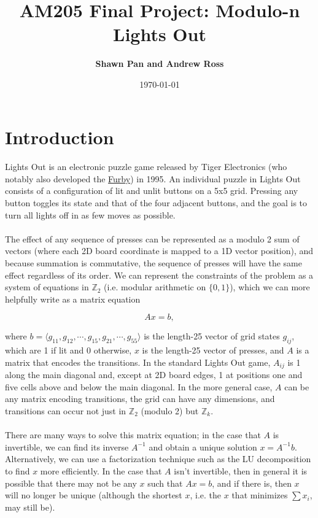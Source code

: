 \documentclass[11pt]{article}
\title{
\vspace{1cm}
\textmd{\textbf{AM205 Final Project: Modulo-n Lights Out}}\\
}
\author{\textbf{Shawn Pan and Andrew Ross}}
\date{\today}
\begin{document}
\maketitle

\section*{Introduction}

\paragraph{} Lights Out is an electronic puzzle game released by Tiger Electronics (who notably also developed the \href{https://en.wikipedia.org/wiki/Furby}{Furby}) in 1995. An individual puzzle in Lights Out consists of a configuration of lit and unlit buttons on a 5x5 grid. Pressing any button toggles its state and that of the four adjacent buttons, and the goal is to turn all lights off in as few moves as possible.

\paragraph{} The effect of any sequence of presses can be represented as a modulo 2 sum of vectors (where each 2D board coordinate is mapped to a 1D vector position), and because summation is commutative, the sequence of presses will have the same effect regardless of its order. We can represent the constraints of the problem as a system of equations in $\mathbb{Z}_2$ (i.e. modular arithmetic on $\{0, 1\}$), which we can more helpfully write as a matrix equation

\begin{equation}
Ax = b,
\end{equation}

\noindent where $b = \langle g_{11}, g_{12}, \cdots, g_{15}, g_{21}, \cdots, g_{55} \rangle$ is the length-25 vector of grid states $g_{ij}$, which are 1 if lit and 0 otherwise, $x$ is the length-25 vector of presses, and $A$ is a matrix that encodes the transitions. In the standard Lights Out game, $A_{ij}$ is 1 along the main diagonal and, except at 2D board edges, 1 at positions one and five cells above and below the main diagonal. In the more general case, $A$ can be any matrix encoding transitions, the grid can have any dimensions, and transitions can occur not just in $\mathbb{Z}_2$ (modulo 2) but $\mathbb{Z}_k$.

\paragraph{} There are many ways to solve this matrix equation; in the case that $A$ is invertible, we can find its inverse $A^{-1}$ and obtain a unique solution $x = A^{-1}b$. Alternatively, we can use a factorization technique such as the LU decomposition to find $x$ more efficiently. In the case that $A$ isn't invertible, then in general it is possible that there may not be any $x$ such that $Ax = b$, and if there is, then $x$ will no longer be unique (although the shortest $x$, i.e. the $x$ that minimizes $\sum x_i$, may still be).
\end{document}
